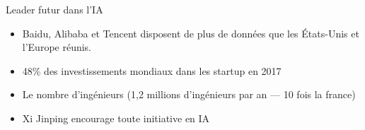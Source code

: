 \begin{frame}
\end{frame}

\begin{frame}{Leader futur dans l'IA}
  \begin{itemize}
    \item Baidu, Alibaba et Tencent disposent de plus de données que les États-Unis et l’Europe réunis.
    \item 48\% des investissements mondiaux dans les startup en 2017
    \item Le nombre d'ingénieurs (1,2 millions d'ingénieurs par an --- 10 fois la france)
    \item Xi Jinping encourage toute initiative en IA
  \end{itemize}
\end{frame}
